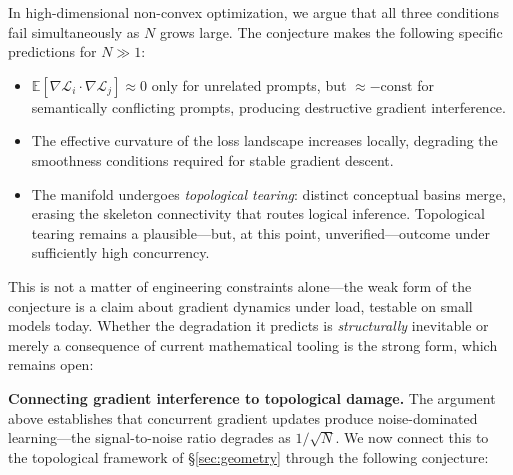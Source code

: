 \documentclass{article}
\begin{document}
In high-dimensional non-convex optimization, we argue that all three conditions fail simultaneously as $N$ grows large. The conjecture makes the following specific predictions for $N \gg 1$:

\begin{itemize}
    \item $\mathbb{E}[\nabla \mathcal{L}_i \cdot \nabla \mathcal{L}_j] \approx 0$ only for unrelated prompts, but $\approx -\text{const}$ for semantically conflicting prompts, producing destructive gradient interference.
    \item The effective curvature of the loss landscape increases locally, degrading the smoothness conditions required for stable gradient descent.
    \item The manifold undergoes \emph{topological tearing}: distinct conceptual basins merge, erasing the skeleton connectivity that routes logical inference. Topological tearing remains a plausible---but, at this point, unverified---outcome under sufficiently high concurrency.
\end{itemize}

This is not a matter of engineering constraints alone---the weak form of the conjecture is a claim about gradient dynamics under load, testable on small models today. Whether the degradation it predicts is \emph{structurally} inevitable or merely a consequence of current mathematical tooling is the strong form, which remains open:

\begin{center}
\end{center}

\medskip
\noindent\textbf{Connecting gradient interference to topological damage.}
The argument above establishes that concurrent gradient updates produce noise-dominated learning---the signal-to-noise ratio degrades as $1/\sqrt{N}$. We now connect this to the topological framework of \S\ref{sec:geometry} through the following conjecture:
\end{document}
